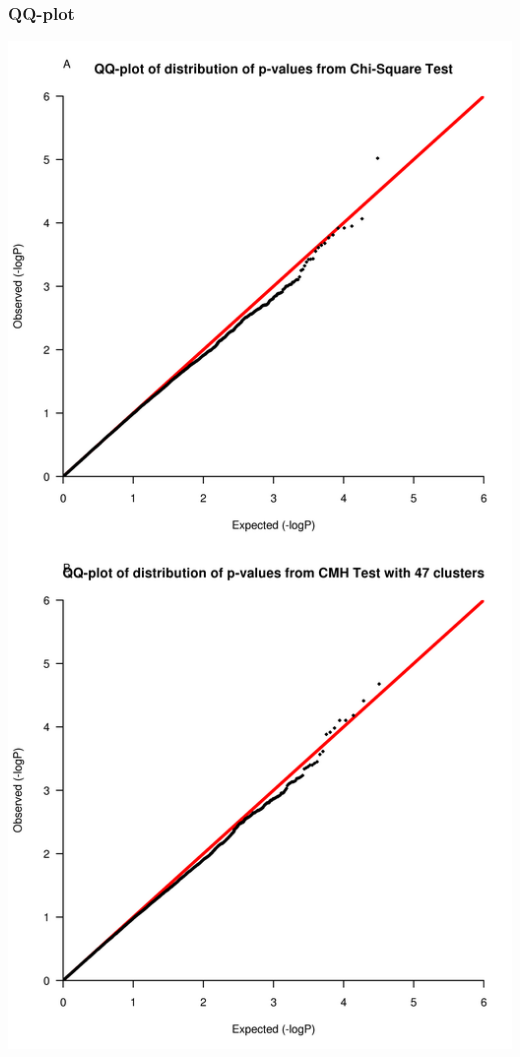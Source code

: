\documentclass[pdf]{beamer}
\begin{document}
\begin{frame}
\frametitle{QQ-plot}
\begin{center}
\includegraphics[scale=0.6]{Figures/qqplotpaper.png} 
\end{center}
\end{frame}
\end{document}

